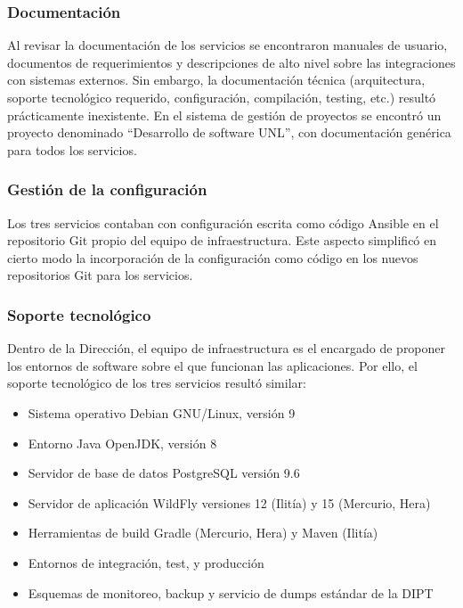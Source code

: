 \subsubsection{Documentación}

Al revisar la documentación de los servicios se encontraron manuales de usuario, documentos de requerimientos y descripciones de alto nivel sobre las integraciones con sistemas externos. Sin embargo, la documentación técnica (arquitectura, soporte tecnológico requerido, configuración, compilación, testing, etc.) resultó prácticamente inexistente. En el sistema de gestión de proyectos se encontró un proyecto denominado “Desarrollo de software UNL”, con documentación genérica para todos los servicios.

\subsubsection{Gestión de la configuración}

Los tres servicios contaban con configuración escrita como código Ansible en el repositorio Git propio del equipo de infraestructura. Este aspecto simplificó en cierto modo la incorporación de la configuración como código en los nuevos repositorios Git para los servicios.

\subsubsection{Soporte tecnológico}

Dentro de la Dirección, el equipo de infraestructura es el encargado de proponer los entornos de software sobre el que funcionan las aplicaciones. Por ello, el soporte tecnológico de los tres servicios resultó similar:

\begin{itemize}
\item Sistema operativo Debian GNU/Linux, versión 9
\item Entorno Java OpenJDK, versión 8
\item Servidor de base de datos PostgreSQL versión 9.6
\item Servidor de aplicación WildFly versiones 12 (Ilitía) y 15 (Mercurio, Hera)
\item Herramientas de build Gradle (Mercurio, Hera) y Maven (Ilitía)
\item Entornos de integración, test, y producción
\item Esquemas de monitoreo, backup y servicio de dumps estándar de la DIPT
\end{itemize}
